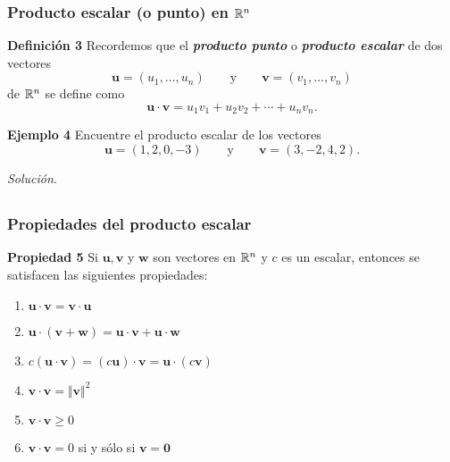 \begin{frame}\frametitle{Producto escalar (o punto) en $\mathbb{R}^n$}

\begin{defi}{\textbf{Definición 3}}\justifying
	Recordemos que el \textbf{\textit{producto punto}} o \textbf{\textit{producto escalar}} de dos vectores
	\[
		\mathbf{u}=(u_1,\hdots,u_n) \qquad \text{y} \qquad \mathbf{v}=(v_1,\hdots,v_n)
	\]
	de $\mathbb{R}^n$ se define como
	\[
	\mathbf{u} \cdot \mathbf{v} = u_1 v_1 + u_2 v_2 +  \cdots + u_n v_n.
	\]
\end{defi}	

\vspace{0mm}


\begin{ej}{\textbf{Ejemplo 4}}
	Encuentre el producto escalar de los vectores 
	\[
		\mathbf{u}=(1,2,0,-3) \qquad \text{y} \qquad \mathbf{v}=(3,-2,4,2).
	\]
\end{ej}
\textit{Solución}.

\end{frame}


\subsection{}

\begin{frame}\frametitle{Propiedades del producto escalar}
	
	\begin{prop}{\textbf{Propiedad 5}}
		\justifying
		Si $\mathbf{u}, \mathbf{v}$ y $\mathbf{w}$ son vectores en $\mathbb{R}^n$ y $c$ es un escalar, entonces se satisfacen 
		las siguientes propiedades:
		\begin{enumerate}
			\item[\labelname{$a$}] $\mathbf{u}\cdot \mathbf{v} = \mathbf{v}\cdot \mathbf{u}$
			\item[\labelname{$b$}] $\mathbf{u}\cdot (\mathbf{v}+\mathbf{w}) = \mathbf{u}\cdot \mathbf{v} + \mathbf{u}\cdot \mathbf{w}$
			\item[\labelname{$c$}] $c(\mathbf{u}\cdot \mathbf{v}) = (c\mathbf{u})\cdot \mathbf{v} = \mathbf{u}\cdot (c\mathbf{v})$
			\item[\labelname{$d$}] $\mathbf{v}\cdot \mathbf{v} = \Vert \mathbf{v} \Vert^2$
			\item[\labelname{$e$}] $\mathbf{v}\cdot \mathbf{v} \geq 0$
			\item[\labelname{$e$}] $\mathbf{v}\cdot \mathbf{v} = 0$ si y sólo si $\mathbf{v} = \mathbf{0}$
		\end{enumerate}
	\end{prop}	
	
	

\end{frame}

